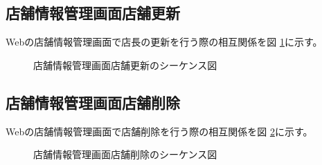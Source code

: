 \documentclass[a4j]{jarticle}
\begin{document}
\subsection{店舗情報管理画面店舗更新}
Webの店舗情報管理画面で店長の更新を行う際の相互関係を図 \ref {tab:oonishi3}に示す。
\begin{figure}[hb]
\begin{center}
\caption{店舗情報管理画面店舗更新のシーケンス図}
\label{tab:oonishi3}
\end{center}
\end{figure}
\subsection{店舗情報管理画面店舗削除}
Webの店舗情報管理画面で店舗削除を行う際の相互関係を図 \ref {tab:oonishi4}に示す。
\begin{figure}[hb]
\begin{center}
\caption{店舗情報管理画面店舗削除のシーケンス図}
\label{tab:oonishi4}
\end{center}
\end{figure}
\end{document}
